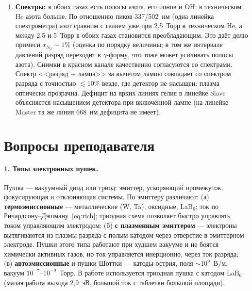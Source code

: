 \documentclass[12pt,a4paper]{article}
\newcommand{\Nt}{\mathrm{N_2}}
\begin{document}
\begin{enumerate}
        слои поджимаются к электродам (с 9 до 1,5--5~мм), и при
        $P_m = 3{,}9$~Торр (чистый He) и $3{,}5$~Торр (технический)
        появляется центральная страта --- признак $\gamma$-формы.
        Соответствующие $P_m L = 14{,}5\pm0{,}4$ и
        $13{,}0\pm0{,}4$~Торр$\cdot$см. Это согласуется с примером
        методички для технического гелия (рис.~4: $\gamma$-форма уже при
        $P_m L = 15$~Торр$\cdot$см), но заметно ниже границы на рис.~6
        для чистого гелия. Причины --- примеси, другой материал
        электродов и мощность.
  \item \textbf{Спектры:} в обоих газах есть полосы азота, его ионов и
        OH; в техническом He азота больше. По отношению пиков
        337/502~нм (одна линейка спектрометра) азот сравним с гелием
        уже при 2,5~Торр в техническом He, а между 2,5 и 5~Торр в обоих
        газах становится преобладающим. Это даёт долю примеси
        $x_{\Nt}\sim 1\%$ (оценка по порядку величины; в том же
        интервале давлений разряд переходит в $\gamma$-форму, что тоже
        может усиливать полосы азота). Снимки в красном канале
        качественно согласуются со спектрами.
        Спектр <<разряд + лампа>> за вычетом лампы совпадает со спектром
        разряда с точностью $\lesssim 10\%$ везде, где детектор не
        насыщен: плазма оптически прозрачна. Дефицит на ярких линиях гелия
        в линейке Slave объясняется насыщением детектора при включённой
        лампе (на линейке Master та же линия 668~нм дефицита не имеет).
\end{enumerate}

\section{Вопросы преподавателя}

\paragraph{1. Типы электронных пушек.}
Пушка --- вакуумный диод или триод: эмиттер, ускоряющий промежуток,
фокусирующая и отклоняющая системы. По эмиттеру различают:
(а) \textbf{термоэмиссионные} --- металлические (W, Ta), оксидные,
LaB$_6$; ток по Ричардсону--Дэшману~\eqref{eq:rich}; триодная схема
позволяет быстро управлять током управляющим электродом;
(б) \textbf{с плазменным эмиттером} --- электроны вытягиваются из
плазмы разряда с полым катодом через отверстие в эмиттерном электроде.
Пушки этого типа работают при худшем вакууме и не боятся химически
активных газов, но ток управляется инерционно, через ток разряда;
(в) \textbf{автоэмиссионные} и пушки Шоттки --- катоды-острия, поля
$\sim 10^9$~В/м, вакуум $10^{-7}$--$10^{-9}$~Торр. В работе
используется триодная пушка с катодом LaB$_6$ (малая работа выхода
2,9~эВ, большой ток с таблетки большой площади).
\end{document}

